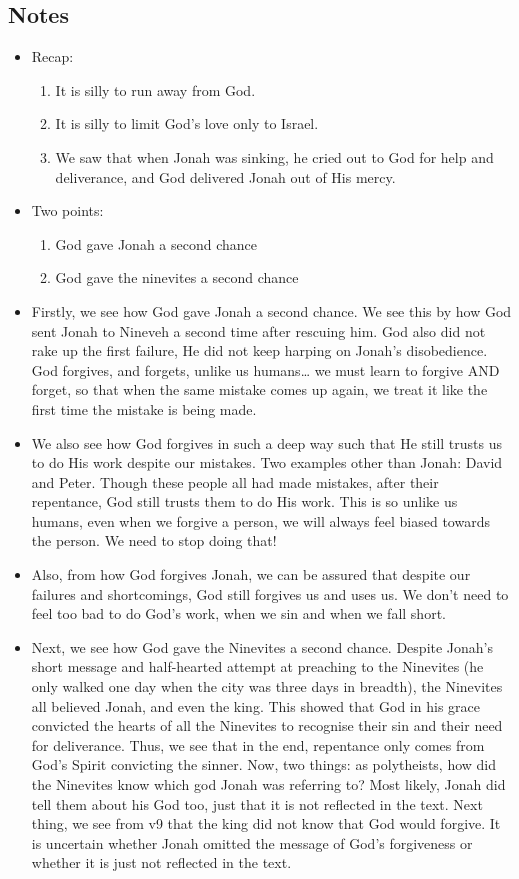 \subsection*{Notes}
\begin{itemize}
  \item{Recap:
  \begin{enumerate}
    \item{It is silly to run away from God.}
    \item{It is silly to limit God’s love only to Israel.}
    \item{We saw that when Jonah was sinking, he cried out to God for help and deliverance, and God delivered Jonah out of His mercy.}
  \end{enumerate}}
  \item{Two points:
  \begin{enumerate}
    \item{God gave Jonah a second chance}
    \item{God gave the ninevites a second chance}
  \end{enumerate}}
  \item{Firstly, we see how God gave Jonah a second chance. We see this by how God sent Jonah to Nineveh a second time after rescuing him. God also did not rake up the first failure, He did not keep harping on Jonah’s disobedience. God forgives, and forgets, unlike us humans… we must learn to forgive AND forget, so that when the same mistake comes up again, we treat it like the first time the mistake is being made.}
  \item{We also see how God forgives in such a deep way such that He still trusts us to do His work despite our mistakes. Two examples other than Jonah: David and Peter. Though these people all had made mistakes, after their repentance, God still trusts them to do His work. This is so unlike us humans, even when we forgive a person, we will always feel biased towards the person. We need to stop doing that!}
  \item{Also, from how God forgives Jonah, we can be assured that despite our failures and shortcomings, God still forgives us and uses us. We don’t need to feel too bad to do God’s work, when we sin and when we fall short.}
  \item{Next, we see how God gave the Ninevites a second chance. Despite Jonah’s short message and half-hearted attempt at preaching to the Ninevites (he only walked one day when the city was three days in breadth), the Ninevites all believed Jonah, and even the king. This showed that God in his grace convicted the hearts of all the Ninevites to recognise their sin and their need for deliverance. Thus, we see that in the end, repentance only comes from God’s Spirit convicting the sinner. Now, two things: as polytheists, how did the Ninevites know which god Jonah was referring to? Most likely, Jonah did tell them about his God too, just that it is not reflected in the text. Next thing, we see from v9 that the king did not know that God would forgive. It is uncertain whether Jonah omitted the message of God’s forgiveness or whether it is just not reflected in the text. }

\end{itemize}
